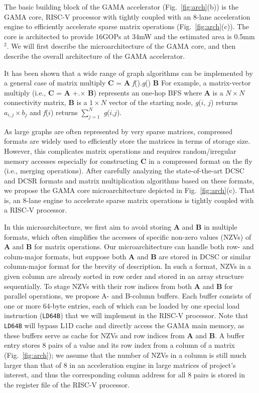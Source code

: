 \noindent
The basic building block of the GAMA accelerator (Fig.~\ref{fig:arch}(b)) is the GAMA core,
RISC-V processor with tightly coupled with an 8-lane acceleration engine to efficiently accelerate sparse matrix operations (Fig.~\ref{fig:arch}(c)).
The core is architected to provide 16GOPs at 34mW and the estimated area is 0.5mm$^2$.
We will first describe the microarchitecture of the GAMA core, and then describe the overall architecture of the GAMA accelerator.


It has been shown that a wide range of graph algorithms can be implemented by a general case of matrix multiply \textbf{C} = \textbf{A} \textit{f}().\textit{g}() \textbf{B} 
For example, a matrix-vector multiply (i.e., \textbf{C} = \textbf{A} +.$\times$ \textbf{B}) represents an one-hop BFS 
where \textbf{A} is a $N \times N$ connectivity matrix, \textbf{B} is a $1 \times N$ vector of the starting node, 
\textit{g}($i$, $j$) returns $a_{i,j} \times b_{j}$ and \textit{f}($i$) returns $\sum_{j=1}^{N}$ \textit{g}($i$,$j$).


As large graphs are often represented by very sparse matrices, compressed formats are widely used to efficiently store the matrices in terms of storage size.
However, this complicates matrix operations and requires random/irregular memory accesses especially for constructing \textbf{C} in a compressed format on the fly (i.e., merging operations).
After carefully analyzing the state-of-the-art DCSC and DCSR formats and matrix multiplication algorithms based on these formats, 
we propose the GAMA core microarchitecture depicted in Fig.~\ref{fig:arch}(c).
That is, an 8-lane engine to accelerate sparse matrix operations is tightly coupled with a RISC-V processor.


In this microarchitecture, we first aim to avoid storing \textbf{A} and \textbf{B} in multiple formats, which often simplifies the accesses of specific non-zero values (NZVs) of \textbf{A} and \textbf{B} for matrix operations.
Our microarchitecture can handle both row- and colum-major formats, but suppose both \textbf{A} and \textbf{B} are stored in DCSC or similar column-major format for the brevity of description.
In such a format, NZVs in a given column are already sorted in row order and stored in an array structure sequentially. 
To stage NZVs with their row indices from both \textbf{A} and \textbf{B} for parallel operations, we propose A- and B-column buffers. 
Each buffer consists of one or more 64-byte entries, each of which can be loaded by one special load instruction (\texttt{LD64B}) that we will implement in the RISC-V processor. 
Note that \texttt{LD64B} will bypass L1D cache and directly access the GAMA main memory, as these buffers serve as cache for NZVs and row indices from \textbf{A} and \textbf{B}.
A buffer entry stores 8 pairs of a value and its row index from a column of a matrix (Fig.~\ref{fig:arch});
we assume that the number of NZVs in a column is still much larger than that of 8 in an acceleration engine in large matrices of project's interest, and thus
the corresponding column address for all 8 pairs is stored in the register file of the RISC-V processor.


